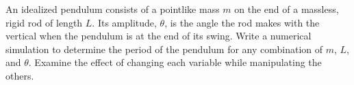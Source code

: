         An idealized pendulum consists of a pointlike mass $m$ on the end of a massless,
        rigid rod of length $L$. Its amplitude, $\theta$, is the angle the rod makes with the
        vertical when the pendulum is at the end of its swing. Write a numerical simulation
        to determine the period of the pendulum for any combination of $m$, $L$, and
        $\theta$. Examine the effect of changing each variable while manipulating the
        others.
